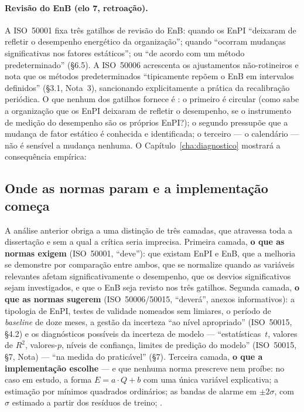 \paragraph{Revisão do EnB (elo 7, retroação).} A ISO~50001 fixa três gatilhos de revisão do EnB: quando os EnPI \enquote{deixaram de refletir o desempenho energético da organização}; quando \enquote{ocorram mudanças significativas nos fatores estáticos}; ou \enquote{de acordo com um método predeterminado} (\S6.5). A ISO~50006 acrescenta os ajustamentos não-rotineiros e nota que os métodos predeterminados \enquote{tipicamente repõem o EnB em intervalos definidos} (\S3.1, Nota~3), sancionando explicitamente a prática da recalibração periódica. O que nenhum dos gatilhos fornece é : o primeiro é circular (como sabe a organização que os EnPI deixaram de refletir o desempenho, se o instrumento de medição do desempenho são os próprios EnPI?); o segundo pressupõe que a mudança de fator estático é conhecida e identificada; o terceiro --- o calendário --- não é sensível a mudança nenhuma. O Capítulo~\ref{cha:diagnostico} mostrará a consequência empírica: 

\subsection{Onde as normas param e a implementação começa}
\label{sec:enb-camadas}

A análise anterior obriga a uma distinção de três camadas, que atravessa toda a dissertação e sem a qual a crítica seria imprecisa. Primeira camada, \textbf{o que as normas exigem} (ISO~50001, \enquote{deve}): que existam EnPI e EnB, que a melhoria se demonstre por comparação entre ambos, que se normalize quando as variáveis relevantes afetam significativamente o desempenho, que os desvios significativos sejam investigados, e que o EnB seja revisto nos três gatilhos. Segunda camada, \textbf{o que as normas sugerem} (ISO~50006/50015, \enquote{deverá}, anexos informativos): a tipologia de EnPI, testes de validade nomeados sem limiares, o período de \emph{baseline}  de doze meses, a gestão da incerteza \enquote{ao nível apropriado} (ISO~50015, \S4.2) e os diagnósticos possíveis da incerteza de modelo --- \enquote{estatísticas~$t$, valores de $R^2$, valores-$p$, níveis de confiança, limites de predição do modelo} (ISO~50015, \S7, Nota) --- \enquote{na medida do praticável} (\S7). Terceira camada, \textbf{o que a implementação escolhe} --- e que nenhuma norma prescreve nem proíbe: no caso em estudo, a forma $E = a \cdot Q + b$ com uma única variável explicativa; a estimação por mínimos quadrados ordinários; as bandas de alarme em $\pm 2\sigma$, com $\sigma$ estimado a partir dos resíduos de treino; .


